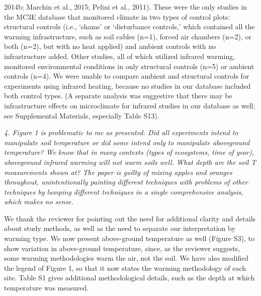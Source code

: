 \documentclass[11pt,a4paper]{letter}
\begin{document}
\begin{letter}{}
2014b; Marchin et al., 2015; Pelini et al., 2011). These were the only studies in the MC3E database that
monitored climate in two types of control plots: structural controls (i.e., `shams' or `disturbance controls,'
which contained all the warming infrastructure, such as soil cables (n=1), forced air chambers (n=2), or both
(n=2), but with no heat applied) and ambient controls with no infrastructure added. Other studies, all of
which utilized infrared warming, monitored environmental conditions in only structural controls (n=5) or
ambient controls (n=4). We were unable to compare ambient and structural controls for experiments using
infrared heating, because no studies in our database included both control types. (A separate analysis was
 suggestive that there may be infrastructure effects on microclimate for infrared studies in our database as
well; see Supplemental Materials, especially Table S13). %
\\
\par \emph{4. Figure 1 is problematic to me as presented. Did all experiments intend to manipulate soil temperature or did some intend only to manipulate aboveground temperature? We know that in many contexts (types of ecosystems, time of year), aboveground infrared warming will not warm soils well. What depth are the soil T measurements shown at? The paper is guilty of mixing apples and oranges throughout, unintentionally painting different techniques with problems of other techniques by lumping different techniques in a single comprehensive analysis, which makes no sense.}
\par We thank the reviewer for pointing out the need for additional clarity and details about study methods, as well as the need to separate our interpretation by warming type. We now present above-ground temperature as well (Figure S3), to show variation in above-ground temperature, since, as the reviewer suggests, some warming methodologies warm the air, not the soil. We have also modified the legend of Figure 1, so that it now states the warming methodology of each site. Table S1 gives additional methodological details, such as the depth at which temperature was measured.
\\


\end{letter}
\end{document}
